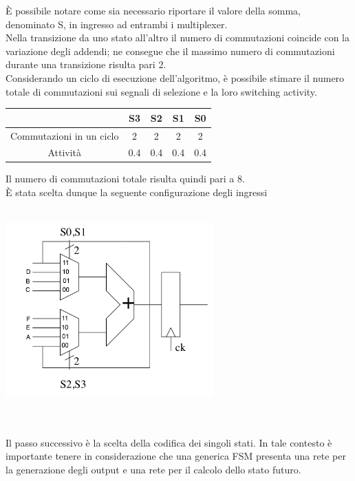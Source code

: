 \documentclass[11pt,  english, makeidx, a4paper, titlepage, oneside]{book}
\begin{document}
\vspace{0.3cm}     
È possibile notare come sia necessario riportare il valore della somma, denominato S, in ingresso ad entrambi i multiplexer.
\\
Nella transizione da uno stato all'altro il numero di commutazioni coincide con la variazione degli addendi; ne consegue che il massimo numero di commutazioni durante una transizione risulta pari 2.\\
Considerando un ciclo di esecuzione dell'algoritmo, è possibile stimare il numero totale di commutazioni sui segnali di selezione e la loro switching activity.\\
\begin{center}
	\begin{tabular}{|c|c|c|c|c|}
	\hline
	 & S3 & S2 & S1 & S0 \\ 
	\hline
	Commutazioni in un ciclo & 2 & 2 & 2 & 2 \\
	\hline
	Attività & 0.4 & 0.4 & 0.4 & 0.4  \\
	\hline
	\end{tabular}	
\end{center}
\vspace{0.3cm}  
Il numero di commutazioni totale risulta quindi pari a 8.\\
È stata scelta dunque la seguente configurazione degli ingressi 
\\\\
\centerline{\includegraphics[width=8cm]{./img/Lab_2/Datapath_input.png}}
\\\\  
Il passo successivo è la scelta della codifica dei singoli stati. In tale contesto è importante tenere in considerazione che una generica FSM presenta una rete per la generazione degli output e una rete per il calcolo dello stato futuro. 
\\\\
\end{document}
